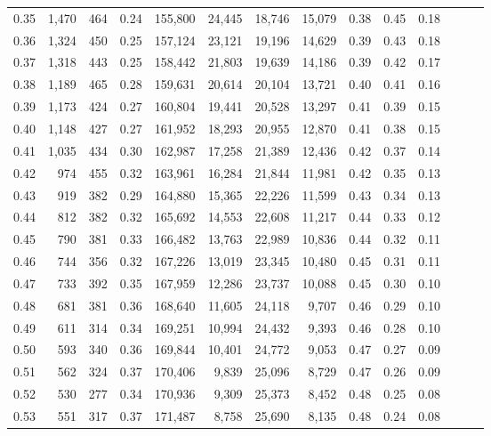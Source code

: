 \begin{tabular}{rrrrrrrrrrrrrr}
0.35 &  1,470 &  464 &  0.24 &  155,800 &   24,445 &  18,746 &  15,079 &  0.38 &  0.45 &      0.18 \\
0.36 &  1,324 &  450 &  0.25 &  157,124 &   23,121 &  19,196 &  14,629 &  0.39 &  0.43 &      0.18 \\
0.37 &  1,318 &  443 &  0.25 &  158,442 &   21,803 &  19,639 &  14,186 &  0.39 &  0.42 &      0.17 \\
0.38 &  1,189 &  465 &  0.28 &  159,631 &   20,614 &  20,104 &  13,721 &  0.40 &  0.41 &      0.16 \\
0.39 &  1,173 &  424 &  0.27 &  160,804 &   19,441 &  20,528 &  13,297 &  0.41 &  0.39 &      0.15 \\
0.40 &  1,148 &  427 &  0.27 &  161,952 &   18,293 &  20,955 &  12,870 &  0.41 &  0.38 &      0.15 \\
0.41 &  1,035 &  434 &  0.30 &  162,987 &   17,258 &  21,389 &  12,436 &  0.42 &  0.37 &      0.14 \\
0.42 &    974 &  455 &  0.32 &  163,961 &   16,284 &  21,844 &  11,981 &  0.42 &  0.35 &      0.13 \\
0.43 &    919 &  382 &  0.29 &  164,880 &   15,365 &  22,226 &  11,599 &  0.43 &  0.34 &      0.13 \\
0.44 &    812 &  382 &  0.32 &  165,692 &   14,553 &  22,608 &  11,217 &  0.44 &  0.33 &      0.12 \\
0.45 &    790 &  381 &  0.33 &  166,482 &   13,763 &  22,989 &  10,836 &  0.44 &  0.32 &      0.11 \\
0.46 &    744 &  356 &  0.32 &  167,226 &   13,019 &  23,345 &  10,480 &  0.45 &  0.31 &      0.11 \\
0.47 &    733 &  392 &  0.35 &  167,959 &   12,286 &  23,737 &  10,088 &  0.45 &  0.30 &      0.10 \\
0.48 &    681 &  381 &  0.36 &  168,640 &   11,605 &  24,118 &   9,707 &  0.46 &  0.29 &      0.10 \\
0.49 &    611 &  314 &  0.34 &  169,251 &   10,994 &  24,432 &   9,393 &  0.46 &  0.28 &      0.10 \\
0.50 &    593 &  340 &  0.36 &  169,844 &   10,401 &  24,772 &   9,053 &  0.47 &  0.27 &      0.09 \\
0.51 &    562 &  324 &  0.37 &  170,406 &    9,839 &  25,096 &   8,729 &  0.47 &  0.26 &      0.09 \\
0.52 &    530 &  277 &  0.34 &  170,936 &    9,309 &  25,373 &   8,452 &  0.48 &  0.25 &      0.08 \\
0.53 &    551 &  317 &  0.37 &  171,487 &    8,758 &  25,690 &   8,135 &  0.48 &  0.24 &      0.08 \\

\end{tabular}
